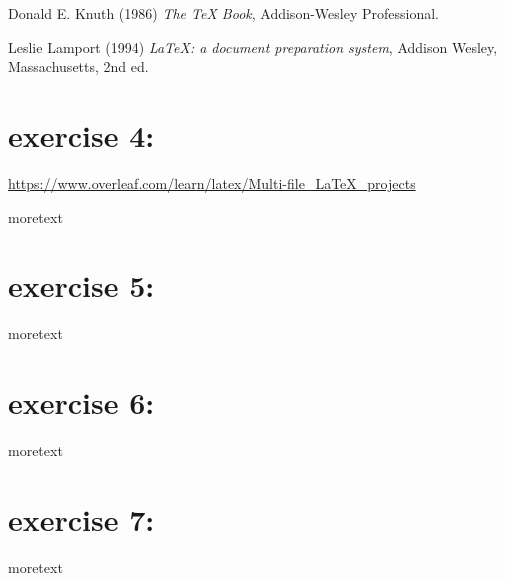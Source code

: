 \documentclass{article}
\begin{document}
\begin{thebibliography}{99}
	Donald E. Knuth (1986) \emph{The \TeX{} Book}, Addison-Wesley Professional.

	Leslie Lamport (1994) \emph{\LaTeX: a document preparation system}, Addison Wesley, Massachusetts, 2nd ed.
\end{thebibliography}

\section{exercise 4:}
\url{https://www.overleaf.com/learn/latex/Multi-file_LaTeX_projects}

moretext
\section{exercise 5:}
moretext
\section{exercise 6:}
moretext
\section{exercise 7:}
moretext
\end{document}
